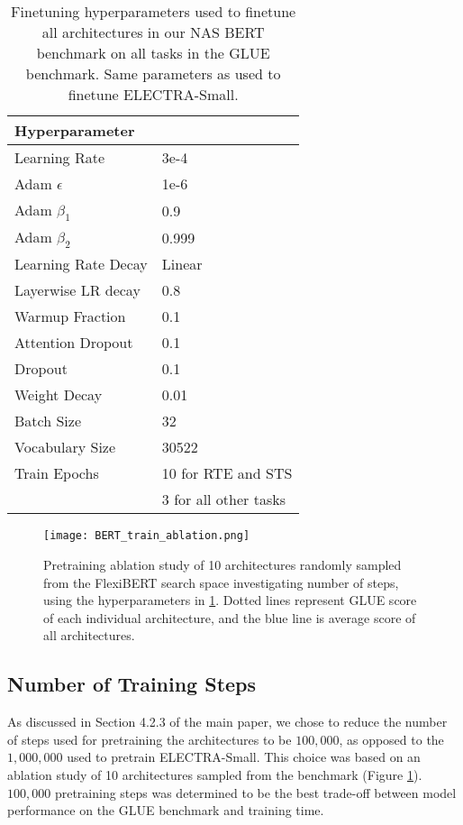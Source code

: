 \documentclass[11pt]{article}
\begin{document}
    \begin{table}[h!]
        \centering 
        \begin{tabular}{l l}
        \hline
        \textbf{Hyperparameter} &  \\
        \hline
        Learning Rate & 3e-4 \\
        Adam $\epsilon$ & 1e-6 \\
        Adam $\beta_1$ & 0.9 \\
        Adam $\beta_2$ & 0.999 \\
        Learning Rate Decay & Linear \\
        Layerwise LR decay & 0.8 \\
        Warmup Fraction & 0.1 \\
        Attention Dropout & 0.1 \\
        Dropout & 0.1 \\
        Weight Decay & 0.01 \\
        Batch Size & 32 \\
        Vocabulary Size & 30522 \\
        Train Epochs & 10 for RTE and STS \\
        & 3 for all other tasks \\
        \hline
        \end{tabular}
        \caption{Finetuning hyperparameters used to finetune all architectures in our NAS BERT benchmark on all tasks in the GLUE benchmark. Same parameters as used to finetune ELECTRA-Small.}
        \label{table3}
    \end{table}

    \begin{figure}[h!]
        \centering
        \texttt{[image: BERT\_train\_ablation.png]}
        \caption{Pretraining ablation study of 10 architectures randomly sampled from the FlexiBERT search space investigating number of steps, using the hyperparameters in \ref{table3}. Dotted lines represent GLUE score of each individual architecture, and the blue line is average score of all architectures.}
        \label{fig6}
    \end{figure}


\subsection{Number of Training Steps} \label{train_steps}
    As discussed in Section 4.2.3 of the main paper, we chose to reduce the number of steps used for pretraining the architectures to be $100,000$, as opposed to the $1,000,000$ used to pretrain ELECTRA-Small. This choice was based on an ablation study of 10 architectures sampled from the benchmark (Figure \ref{fig6}). $100,000$ pretraining steps was determined to be the best trade-off between model performance on the GLUE benchmark and training time.
    
\end{document}
